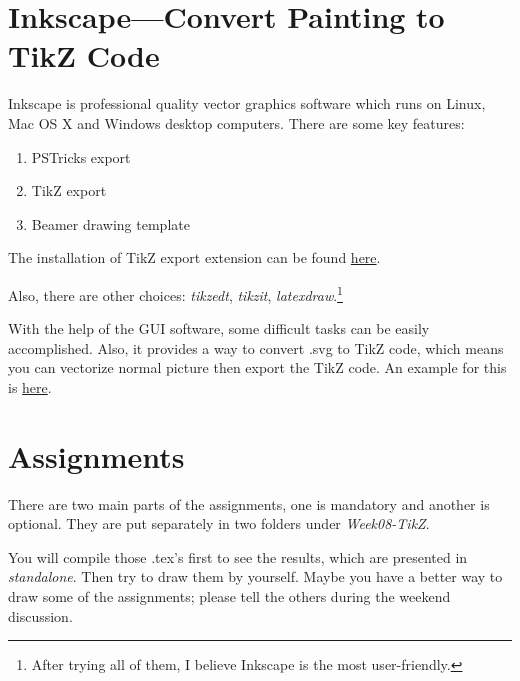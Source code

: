 \documentclass[english]{../TeXTemplate/pkupaper}
\begin{document}
\section{Inkscape---Convert Painting to TikZ Code}
Inkscape is professional quality vector graphics software
which runs on Linux, Mac OS X and Windows desktop computers.
There are some key features:
\begin{enumerate}
    \item PSTricks export 
    \item TikZ export 
    \item Beamer drawing template
\end{enumerate}
The installation of TikZ export extension can be found 
\href{http://www.inkscapeforum.com/viewtopic.php?t=17898}{here}.\par
Also, there are other choices: \textit{tikzedt}, \textit{tikzit},
\textit{latexdraw}.\footnote{After trying all of them, I believe 
Inkscape is the most user-friendly.}\par
With the help of the GUI software, some difficult tasks can be 
easily accomplished. Also, it provides a way to convert .svg to
TikZ code, which means you can vectorize normal picture then 
export the TikZ code. An example for this is \href{https://tex.stackexchange.com/questions/60422/how-to-export-svg-to-tikz?noredirect=1&lq=1}{here}.


\section{Assignments}
There are two main parts of the assignments, one is mandatory and another is optional.
They are put separately in two folders under \textit{Week08-TikZ}.\par

You will compile those .tex's first to see the results, which are presented in 
\textit{standalone}. Then try to draw them by yourself.
Maybe you have a better way to draw some of the assignments;
please tell the others during the weekend discussion.
\end{document}
